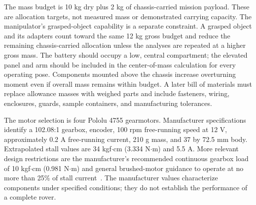 \documentclass[11pt,letterpaper]{article}
\begin{document}
The mass budget is 10 kg dry plus 2 kg of chassis-carried mission payload. These are allocation targets, not measured mass or demonstrated carrying capacity. The manipulator's grasped-object capability is a separate constraint. A grasped object and its adapters count toward the same 12 kg gross budget and reduce the remaining chassis-carried allocation unless the analyses are repeated at a higher gross mass. The battery should occupy a low, central compartment; the elevated panel and arm should be included in the center-of-mass calculation for every operating pose. Components mounted above the chassis increase overturning moment even if overall mass remains within budget. A later bill of materials must replace allowance masses with weighed parts and include fasteners, wiring, enclosures, guards, sample containers, and manufacturing tolerances.

The motor selection is four Pololu 4755 gearmotors. Manufacturer specifications identify a 102.08:1 gearbox, encoder, 100 rpm free-running speed at 12 V, approximately 0.2 A free-running current, 210 g mass, and 37 by 72.5 mm body. Extrapolated stall values are 34 kgf\ensuremath{\cdot}cm (3.334 N\ensuremath{\cdot}m) and 5.5 A. More relevant design restrictions are the manufacturer's recommended continuous gearbox load of 10 kgf\ensuremath{\cdot}cm (0.981 N\ensuremath{\cdot}m) and general brushed-motor guidance to operate at no more than 25\% of stall current~\cite{ENG_MOTOR}. The manufacturer values characterize components under specified conditions; they do not establish the performance of a complete rover.
\end{document}
